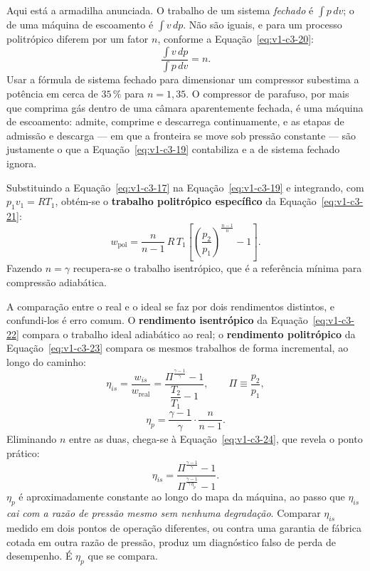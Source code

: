 \documentclass[12pt,a4paper]{article}
\numberwithin{equation}{section}
\numberwithin{table}{section}
\numberwithin{figure}{section}
\begin{document}
Aqui está a armadilha anunciada. O trabalho de um sistema \emph{fechado} é
$\int p\,dv$; o de uma máquina de escoamento é $\int v\,dp$. Não são iguais, e
para um processo politrópico diferem por um fator $n$, conforme a
Equação~\eqref{eq:v1-c3-20}:
\begin{equation}\label{eq:v1-c3-20}
\frac{\int v\,dp}{\int p\,dv} = n .
\end{equation}
Usar a fórmula de sistema fechado para dimensionar um compressor subestima a
potência em cerca de $35\,\%$ para $n = 1{,}35$. O compressor de parafuso, por
mais que comprima gás dentro de uma câmara aparentemente fechada, é uma máquina
de escoamento: admite, comprime e descarrega continuamente, e as etapas de
admissão e descarga --- em que a fronteira se move sob pressão constante ---
são justamente o que a Equação~\eqref{eq:v1-c3-19} contabiliza e a de sistema
fechado ignora.

Substituindo a Equação~\eqref{eq:v1-c3-17} na Equação~\eqref{eq:v1-c3-19} e
integrando, com $p_1v_1 = RT_1$, obtém-se o \textbf{trabalho politrópico
específico} da Equação~\eqref{eq:v1-c3-21}:
\begin{equation}\label{eq:v1-c3-21}
w_{\text{pol}} = \frac{n}{n-1}\,R\,T_1
\left[ \left(\frac{p_2}{p_1}\right)^{\frac{n-1}{n}} - 1 \right] .
\end{equation}
Fazendo $n = \gamma$ recupera-se o trabalho isentrópico, que é a referência
mínima para compressão adiabática.

A comparação entre o real e o ideal se faz por dois rendimentos distintos, e
confundi-los é erro comum. O \textbf{rendimento isentrópico} da
Equação~\eqref{eq:v1-c3-22} compara o trabalho ideal adiabático ao real; o
\textbf{rendimento politrópico} da Equação~\eqref{eq:v1-c3-23} compara os
mesmos trabalhos de forma incremental, ao longo do caminho:
\begin{equation}\label{eq:v1-c3-22}
\eta_{is} = \frac{w_{is}}{w_{\text{real}}}
= \frac{\Pi^{\frac{\gamma-1}{\gamma}} - 1}{\dfrac{T_2}{T_1} - 1},
\qquad \Pi \equiv \frac{p_2}{p_1},
\end{equation}
\begin{equation}\label{eq:v1-c3-23}
\eta_p = \frac{\gamma-1}{\gamma}\cdot\frac{n}{n-1} .
\end{equation}
Eliminando $n$ entre as duas, chega-se à
Equação~\eqref{eq:v1-c3-24}, que revela o ponto prático:
\begin{equation}\label{eq:v1-c3-24}
\eta_{is} = \frac{\Pi^{\frac{\gamma-1}{\gamma}} - 1}
{\Pi^{\frac{\gamma-1}{\gamma\,\eta_p}} - 1} .
\end{equation}
$\eta_p$ é aproximadamente constante ao longo do mapa da máquina, ao passo que
$\eta_{is}$ \emph{cai com a razão de pressão mesmo sem nenhuma degradação}.
Comparar $\eta_{is}$ medido em dois pontos de operação diferentes, ou contra
uma garantia de fábrica cotada em outra razão de pressão, produz um diagnóstico
falso de perda de desempenho. É $\eta_p$ que se compara.
\end{document}
